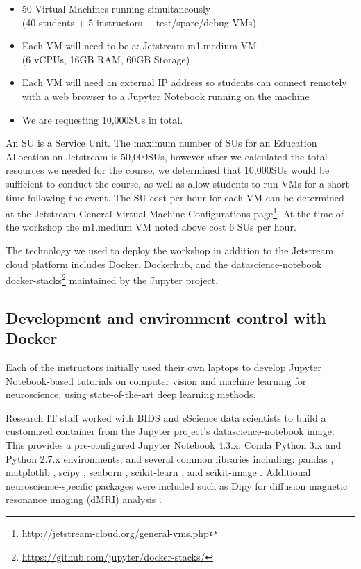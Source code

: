 \begin{itemize}
\item 50 Virtual Machines running simultaneously \\(40 students + 5 instructors +
test/spare/debug VMs)
\item Each VM will need to be a: Jetstream m1.medium VM \\(6 vCPUs, 16GB RAM, 60GB
  Storage)
\item Each VM will need an external IP address so students can connect remotely
  with a web browser to a Jupyter Notebook running on the machine
\item We are requesting 10,000SUs in total.
\end{itemize}

An SU is a Service Unit. The maximum number of SUs for an Education Allocation
on Jetstream is 50,000SUs, however after we calculated the total resources we
needed for the course, we determined that 10,000SUs would be sufficient to
conduct the course, as well as allow students to run VMs for a short time
following the event. The SU cost per hour for each VM can be determined at the
Jetstream General Virtual Machine Configurations page\footnote{\url{http://jetstream-cloud.org/general-vms.php}}.
At the time of the workshop the m1.medium VM noted above cost 6 SUs per hour.

The technology we used to deploy the workshop in addition to the Jetstream cloud
platform includes Docker, Dockerhub, and the datascience-notebook docker-stacks\footnote{\url{https://github.com/jupyter/docker-stacks/}}
maintained by the Jupyter project.

\subsection{Development and environment control with Docker}

Each of the instructors initially used their own laptops to develop Jupyter
Notebook-based tutorials on computer vision and machine learning for
neuroscience, using state-of-the-art deep learning methods.

Research IT staff worked with BIDS and eScience data scientists to build a
customized container from the Jupyter project's datascience-notebook image. This
provides a pre-configured Jupyter Notebook 4.3.x; Conda Python 3.x and Python
2.7.x environments; and several common libraries including: pandas
\cite{mckinney-proc-scipy-2010}, matplotlib \cite{hunter2007matplotlib}, scipy
\cite{scipy}, seaborn \cite{michael_waskom_2014_12710}, scikit-learn
\cite{Pedregosa2012-dm}, and scikit-image \cite{van2014scikit}. Additional
neuroscience-specific packages were included such as Dipy for diffusion magnetic
resonance imaging (dMRI) analysis \cite{Garyfallidis2014FrontNeuroinf}.

